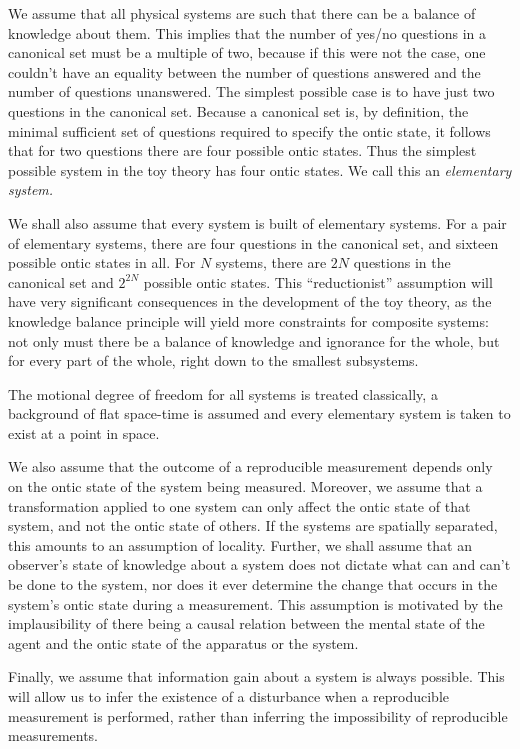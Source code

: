 \documentclass[pra,twocolumn,nofootinbib,showpacs]{revtex4}
\begin{document}
We assume that all physical systems are such that there can be a balance of
knowledge about them. This implies that the number of yes/no questions in a
canonical set must be a multiple of two, because if this were not the case,
one couldn't have an equality between the number of questions answered and
the number of questions unanswered. The simplest possible case is to have
just two questions in the canonical set. Because a canonical set is, by
definition, the minimal sufficient set of questions required to specify the
ontic state, it follows that for two questions there are four possible ontic
states. Thus the simplest possible system in the toy theory has four ontic
states. We call this an \emph{elementary system.}

We shall also assume that every system is built of elementary systems. For a
pair of elementary systems, there are four questions in the canonical set,
and sixteen possible ontic states in all. For $N$ systems, there are $2N$
questions in the canonical set and $2^{2N}$ possible ontic states. This
``reductionist'' assumption will have very significant consequences in the
development of the toy theory, as the knowledge balance principle will yield
more constraints for composite systems: not only must there be a balance of
knowledge and ignorance for the whole, but for every part of the whole,
right down to the smallest subsystems.

The motional degree of freedom for all systems is treated classically, a
background of flat space-time is assumed and every elementary system is
taken to exist at a point in space.

We also assume that the outcome of a reproducible measurement depends only
on the ontic state of the system being measured. Moreover, we assume that a
transformation applied to one system can only affect the ontic state of that
system, and not the ontic state of others. If the systems are spatially
separated, this amounts to an assumption of locality. Further, we shall
assume that an observer's state of knowledge about a system does not dictate
what can and can't be done to the system, nor does it ever determine the
change that occurs in the system's ontic state during a measurement. This
assumption is motivated by the implausibility of there being a causal
relation between the mental state of the agent and the ontic state of the
apparatus or the system.

Finally, we assume that information gain about a system is always possible.
This will allow us to infer the existence of a disturbance when a
reproducible measurement is performed, rather than inferring the
impossibility of reproducible measurements.
\end{document}
